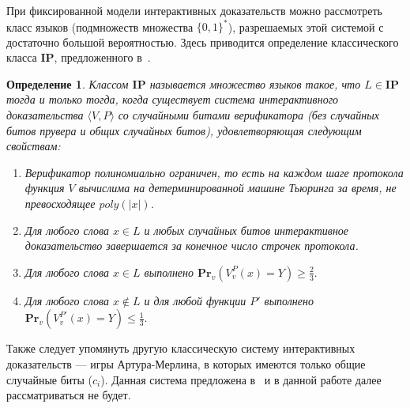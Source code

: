 \documentclass[14pt, a4paper]{extreport}
\newtheorem{definition}{\indent Определение}
\newcommand{\word}{\{0, 1\}^*}
\newcommand{\poly}{\textit{poly}}
\newcommand{\pr}[2]{\textbf{Pr}_{#1}\left(#2\right)}
\begin{document}
При фиксированной модели интерактивных доказательств можно рассмотреть класс языков (подмножеств множества $\word$), разрешаемых этой системой с достаточно большой вероятностью. Здесь приводится определение классического класса $\textbf{IP}$, предложенного в~\cite{goldwasser1989ip}.
\begin{definition}\label{ip}
    Классом $\textbf{IP}$ называется множество языков такое, что $L \in \textbf{IP}$ тогда и только тогда, когда существует система интерактивного доказательства $\langle V, P\rangle$ со случайными битами верификатора (без случайных битов прувера и общих случайных битов), удовлетворяющая следующим свойствам:
    \begin{enumerate}
        \item Верификатор полиномиально ограничен, то есть на каждом шаге протокола функция $V$ вычислима на детерминированной машине Тьюринга за время, не превосходящее $\poly(|x|)$.
        \item Для любого слова $x \in L$ и любых случайных битов интерактивное доказательство завершается за конечное число строчек протокола.
        \item Для любого слова $x \in L$ выполнено $\pr{v}{V^P_{v}(x) = Y} \geqslant \frac{2}{3}.$
        \item Для любого слова $x \notin L$ и для любой функции $P'$ выполнено\\$\pr{v}{V^{P'}_{v}(x) = Y} \leqslant \frac{1}{3}.$
    \end{enumerate}
\end{definition}
Также следует упомянуть другую классическую систему интерактивных доказательств --- игры Артура-Мерлина, в которых имеются только общие случайные биты ($c_{i}$). Данная система предложена в~\cite{babai1988arthur} и в данной работе далее рассматриваться не будет.
\end{document}
